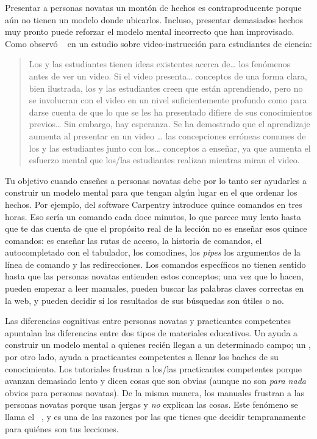 Presentar a personas novatas un montón de hechos es contraproducente
porque aún no tienen un modelo donde ubicarlos.
Incluso,
presentar demasiados hechos muy pronto puede reforzar
el modelo mental incorrecto que han improvisado.
Como observó ~\cite{Mull2007a} en un estudio sobre video-instrucción para estudiantes de ciencia:

\begin{quote}
Los y las estudiantes tienen ideas existentes acerca de{\ldots} los fenómenos antes de ver un video. Si el video presenta{\ldots} conceptos de una forma clara, bien ilustrada, los y las estudiantes creen que están aprendiendo, pero no se involucran con el video en un nivel suficientemente profundo como para darse cuenta de que lo que se les ha presentado difiere de sus conocimientos previos{\ldots} Sin embargo, hay esperanza. Se ha demostrado que el aprendizaje aumenta al presentar en un video {\ldots} las concepciones erróneas comunes de los y las estudiantes junto con los{\ldots} conceptos a enseñar, ya que aumenta el esfuerzo mental que los/las estudiantes realizan mientras miran el video. 
\end{quote}

Tu objetivo cuando enseñes a personas novatas debe por lo tanto ser
ayudarles a construir un modelo mental
para que tengan algún lugar en el que ordenar los hechos.
Por ejemplo,
 del software Carpentry
introduce quince comandos en tres horas.
Eso sería un comando cada doce minutos,
lo que parece muy lento hasta que te das cuenta de que
el propósito real de la lección no es enseñar esos quince comandos:
es enseñar las rutas de acceso,
la historia de comandos,
el autocompletado con el tabulador,
los comodines,
los \emph{pipes}
los argumentos de la línea de comando
y las redirecciones.
Los comandos específicos no tienen sentido hasta que las personas novatas entienden estos conceptos;
una vez que lo hacen,
pueden empezar a leer manuales,
pueden buscar las palabras claves correctas en la web,
y pueden decidir si los resultados de sus búsquedas son útiles o no.

Las diferencias cognitivas entre personas novatas y practicantes competentes
apuntalan las diferencias entre dos tipos de materiales educativos.
Un  ayuda a construir un modelo mental a quienes recién llegan a un determinado campo;
un ,
por otro lado,
ayuda a practicantes competentes a llenar los baches de su conocimiento.
Los tutoriales frustran a los/las practicantes competentes porque avanzan demasiado lento
y dicen cosas que son obvias
(aunque no son \emph{para nada} obvios para personas novatas).
De la misma manera,
los manuales frustran a las personas novatas porque usan jergas y \emph{no} explican las cosas.
Este fenómeno se llama el  ~\cite{Kaly2003},
y es una de las razones por las que tienes que decidir tempranamente para quiénes son tus lecciones. 

